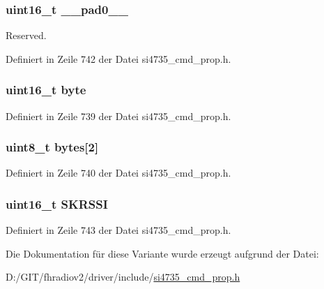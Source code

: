 \subsubsection[{\+\_\+\+\_\+pad0\+\_\+\+\_\+}]{\setlength{\rightskip}{0pt plus 5cm}uint16\+\_\+t \+\_\+\+\_\+pad0\+\_\+\+\_\+}\label{unionfm__seek__tune__rssi__thres_a77132c2c26a75f5b8751b235cda23828}


Reserved. 



Definiert in Zeile 742 der Datei si4735\+\_\+cmd\+\_\+prop.\+h.

\hypertarget{unionfm__seek__tune__rssi__thres_ab0549c1b5ea980a02e7eab77e21fea49}{}
\subsubsection[{byte}]{\setlength{\rightskip}{0pt plus 5cm}uint16\+\_\+t byte}\label{unionfm__seek__tune__rssi__thres_ab0549c1b5ea980a02e7eab77e21fea49}


Definiert in Zeile 739 der Datei si4735\+\_\+cmd\+\_\+prop.\+h.

\hypertarget{unionfm__seek__tune__rssi__thres_a46e4c05d20a047ec169f60d3167e912e}{}
\subsubsection[{bytes}]{\setlength{\rightskip}{0pt plus 5cm}uint8\+\_\+t bytes\mbox{[}2\mbox{]}}\label{unionfm__seek__tune__rssi__thres_a46e4c05d20a047ec169f60d3167e912e}


Definiert in Zeile 740 der Datei si4735\+\_\+cmd\+\_\+prop.\+h.

\hypertarget{unionfm__seek__tune__rssi__thres_aa2c04a5a0172c82e128c710e747f345e}{}
\subsubsection[{S\+K\+R\+S\+S\+I}]{\setlength{\rightskip}{0pt plus 5cm}uint16\+\_\+t S\+K\+R\+S\+S\+I}\label{unionfm__seek__tune__rssi__thres_aa2c04a5a0172c82e128c710e747f345e}


Definiert in Zeile 743 der Datei si4735\+\_\+cmd\+\_\+prop.\+h.



Die Dokumentation für diese Variante wurde erzeugt aufgrund der Datei\+:\begin{DoxyCompactItemize}
\item 
D\+:/\+G\+I\+T/fhradiov2/driver/include/\hyperlink{si4735__cmd__prop_8h}{si4735\+\_\+cmd\+\_\+prop.\+h}\end{DoxyCompactItemize}
